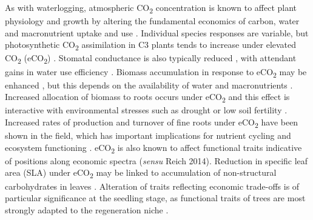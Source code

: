 \documentclass[12pt,a4paper]{memoir}
\begin{document}
As with waterlogging, atmospheric CO\textsubscript{2} concentration is known to affect plant physiology and growth by altering the fundamental economics of carbon, water and macronutrient uptake and use \citep{Poorter2003a, Wang2012, Reich2014}.  Individual species responses are variable, but photosynthetic CO\textsubscript{2} assimilation in C3 plants tends to increase under elevated CO\textsubscript{2} (eCO\textsubscript{2}) \citep{Curtis1996}. Stomatal conductance is also typically reduced \citep{Ainsworth2007}, with attendant gains in water use efficiency \citep{Holtum2010, Keenan2013, VanderSleen2014}. Biomass accumulation in response to eCO\textsubscript{2} may be enhanced \citep{Wang2012}, but this depends on the availability of water and macronutrients \citep{Korner2006, Manea2014, Reich2014}. Increased allocation of biomass to roots occurs under eCO\textsubscript{2} \citep{Nie2013} and this effect is interactive with environmental stresses such as drought or low soil fertility \citep{Wang2010}. Increased rates of production and turnover of fine roots under eCO\textsubscript{2} have been shown in the field, which has important implications for nutrient cycling and ecosystem functioning \citep{Pregitzer1995, Pregitzer2000, Matamala2000, Lipson2014}. eCO\textsubscript{2} is also known to affect functional traits indicative of positions along economic spectra (\textit{sensu} Reich 2014). Reduction in specific leaf area (SLA) under eCO\textsubscript{2} may be linked to accumulation of non-structural carbohydrates in leaves \citep{Poorter2003a, Bader2010}. Alteration of traits reflecting economic trade-offs is of particular significance at the seedling stage, as functional traits of trees are most strongly adapted to the regeneration niche \citep{Poorter2007}.
\end{document}
